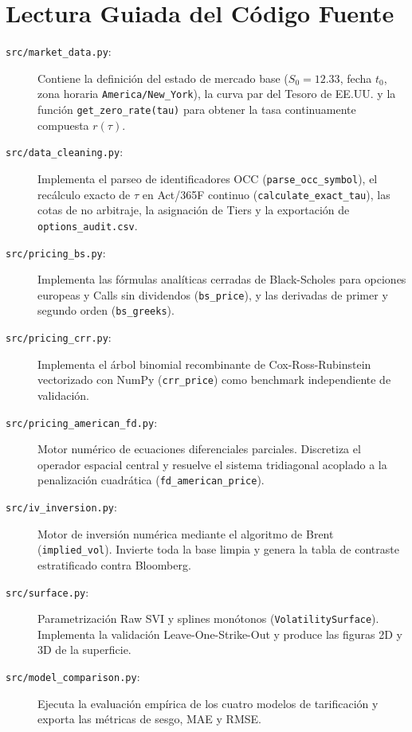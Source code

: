 \documentclass[11pt,a4paper]{article}
\begin{document}
\newpage
\section{Lectura Guiada del Código Fuente}

\begin{description}
    \item[\texttt{src/market\_data.py}:] Contiene la definición del estado de mercado base ($S_0 = 12.33$, fecha $t_0$, zona horaria \texttt{America/New\_York}), la curva par del Tesoro de EE.UU. y la función \texttt{get\_zero\_rate(tau)} para obtener la tasa continuamente compuesta $r(\tau)$.
    \item[\texttt{src/data\_cleaning.py}:] Implementa el parseo de identificadores OCC (\texttt{parse\_occ\_symbol}), el recálculo exacto de $\tau$ en Act/365F continuo (\texttt{calculate\_exact\_tau}), las cotas de no arbitraje, la asignación de Tiers y la exportación de \texttt{options\_audit.csv}.
    \item[\texttt{src/pricing\_bs.py}:] Implementa las fórmulas analíticas cerradas de Black-Scholes para opciones europeas y Calls sin dividendos (\texttt{bs\_price}), y las derivadas de primer y segundo orden (\texttt{bs\_greeks}).
    \item[\texttt{src/pricing\_crr.py}:] Implementa el árbol binomial recombinante de Cox-Ross-Rubinstein vectorizado con NumPy (\texttt{crr\_price}) como benchmark independiente de validación.
    \item[\texttt{src/pricing\_american\_fd.py}:] Motor numérico de ecuaciones diferenciales parciales. Discretiza el operador espacial central y resuelve el sistema tridiagonal acoplado a la penalización cuadrática (\texttt{fd\_american\_price}).
    \item[\texttt{src/iv\_inversion.py}:] Motor de inversión numérica mediante el algoritmo de Brent (\texttt{implied\_vol}). Invierte toda la base limpia y genera la tabla de contraste estratificado contra Bloomberg.
    \item[\texttt{src/surface.py}:] Parametrización Raw SVI y splines monótonos (\texttt{VolatilitySurface}). Implementa la validación Leave-One-Strike-Out y produce las figuras 2D y 3D de la superficie.
    \item[\texttt{src/model\_comparison.py}:] Ejecuta la evaluación empírica de los cuatro modelos de tarificación y exporta las métricas de sesgo, MAE y RMSE.

\end{description}
\end{document}
